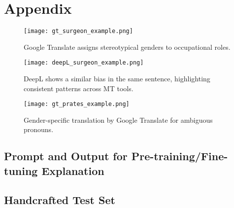 \chapter*{Appendix}

\begin{figure}
	\centering
		\texttt{[image: gt\_surgeon\_example.png]}
	\caption{Google Translate assigns stereotypical genders to occupational roles.}
	\label{fig:gt_surgeon_example}
\end{figure}

\begin{figure}
	\centering
		\texttt{[image: deepL\_surgeon\_example.png]}
	\caption{DeepL shows a similar bias in the same sentence, highlighting consistent patterns across MT tools.}
	\label{fig:deepL_surgeon_example}
\end{figure}

\begin{figure}
	\centering
		\texttt{[image: gt\_prates\_example.png]}
	\caption{Gender-specific translation by Google Translate for ambiguous pronouns.}
	\label{fig:gt_prates_example}
\end{figure}

\section{Prompt and Output for Pre-training/Fine-tuning Explanation}
\label{appendix:prompt_pdf}


\section{Handcrafted Test Set}
\label{appendix:handcrafted_testset}

